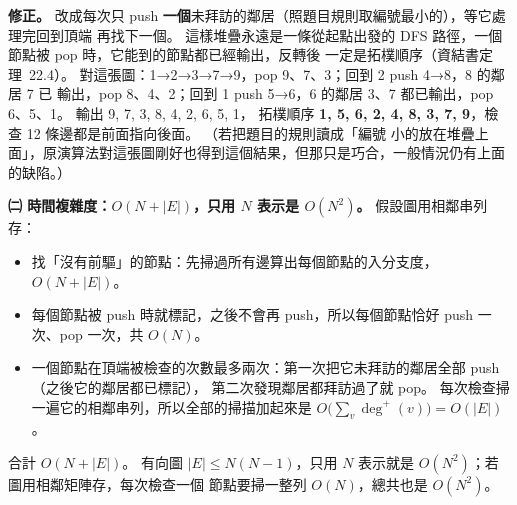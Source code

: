 \begin{pastsoln}
\textbf{修正。} 改成每次只 push \textbf{一個}未拜訪的鄰居（照題目規則取編號最小的），等它處理完回到頂端
再找下一個。 這樣堆疊永遠是一條從起點出發的 DFS 路徑，一個節點被 pop 時，它能到的節點都已經輸出，反轉後
一定是拓樸順序（資結書定理~22.4）。 對這張圖：1→2→3→7→9，pop 9、7、3；回到 2 push 4→8，8 的鄰居 7 已
輸出，pop 8、4、2；回到 1 push 5→6，6 的鄰居 3、7 都已輸出，pop 6、5、1。 輸出 9, 7, 3, 8, 4, 2, 6, 5, 1，
拓樸順序 \textbf{1, 5, 6, 2, 4, 8, 3, 7, 9}，檢查 12 條邊都是前面指向後面。 （若把題目的規則讀成「編號
小的放在堆疊上面」，原演算法對這張圖剛好也得到這個結果，但那只是巧合，一般情況仍有上面的缺陷。）

\textbf{㈡ 時間複雜度：$O(N + |E|)$，只用 $N$ 表示是 $O(N^2)$。} 假設圖用相鄰串列存：
\begin{itemize}
\item 找「沒有前驅」的節點：先掃過所有邊算出每個節點的入分支度，$O(N + |E|)$。
\item 每個節點被 push 時就標記，之後不會再 push，所以每個節點恰好 push 一次、pop 一次，共 $O(N)$。
\item 一個節點在頂端被檢查的次數最多兩次：第一次把它未拜訪的鄰居全部 push（之後它的鄰居都已標記），
第二次發現鄰居都拜訪過了就 pop。 每次檢查掃一遍它的相鄰串列，所以全部的掃描加起來是
$O\bigl(\sum_v \deg^+(v)\bigr) = O(|E|)$。
\end{itemize}
合計 $O(N + |E|)$。 有向圖 $|E| \le N(N-1)$，只用 $N$ 表示就是 $O(N^2)$；若圖用相鄰矩陣存，每次檢查一個
節點要掃一整列 $O(N)$，總共也是 $O(N^2)$。
\end{pastsoln}
